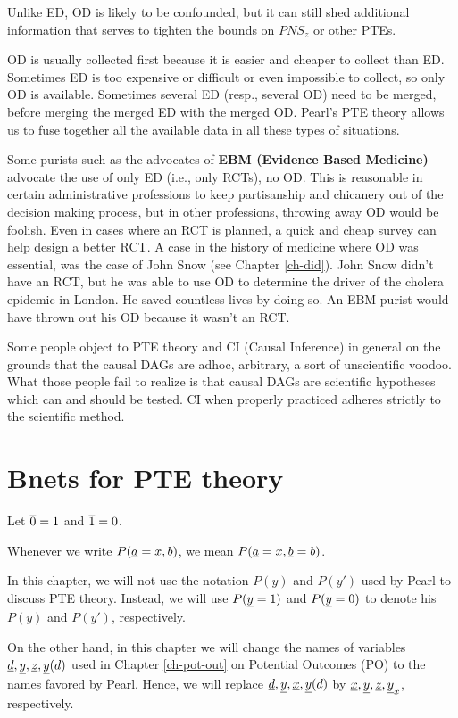 Unlike ED, OD is likely
to be confounded, but
it can still shed 
additional information
that serves to tighten 
the bounds on 
$PNS_z$ or other PTEs. 

OD is usually collected first
because it is easier and cheaper to collect 
than ED. Sometimes ED is too expensive or difficult 
or even impossible to collect,
so only OD is available.
Sometimes several ED (resp., several OD)
need to be merged, before merging
the merged ED with the merged OD. Pearl's PTE theory
allows us to fuse together all the 
available data
in all these types of 
situations. 

Some purists such as the advocates of 
{\bf EBM (Evidence
Based Medicine)} advocate the use of
only ED (i.e., only RCTs), no OD. 
This is reasonable
in certain administrative  professions
to keep partisanship and chicanery out
of the decision making process, 
but in other professions, throwing away OD
would be foolish. 
Even in cases
where an RCT is planned,
a quick and cheap survey
can help design a better RCT.
A case in
the history 
of medicine 
where OD was essential, was the case of
John Snow (see Chapter \ref{ch-did}). John Snow
didn't have
an RCT, but he was able to
use OD to determine
the driver of 
the cholera epidemic in London.
He saved countless lives by 
doing so. An EBM purist
would have thrown
out his OD because it
wasn't an RCT.

Some people object to PTE theory
and CI (Causal Inference) in general on the 
grounds that the causal DAGs
 are adhoc, arbitrary, a
sort of unscientific voodoo. What 
those people fail to realize is
that causal DAGs are scientific
hypotheses which can and should be tested.
CI when properly
practiced 
adheres strictly to the scientific method.





\section{Bnets for PTE theory}
\quad

Let $\overline{0}=1$ and $\overline{1}=0$.

Whenever we write $P({\underline{a}}=x, b)$, 
we mean $P({\underline{a}}=x, {\underline{b}}=b)$.

In this chapter, we will
not use the notation
$P(y)$ and $P(y')$
used by Pearl to
discuss PTE theory.
Instead, we will
use $P({\underline{y}}=1)$ and
$P({\underline{y}}=0)$
to denote his 
$P(y)$ and $P(y')$, respectively. 


On the other hand, 
in this chapter
we will change the names 
of variables ${\underline{d}}, {\underline{y}}, {\underline{z}}, {\underline{y}}(d)$
used 
in Chapter \ref{ch-pot-out} on Potential
Outcomes (PO)
to the names favored by Pearl.
Hence, we will replace
${\underline{d}}, {\underline{y}}, {\underline{x}}, {\underline{y}}(d)$
by
${\underline{x}}, {\underline{y}}, {\underline{z}}, {\underline{y}}_x$,
respectively.



